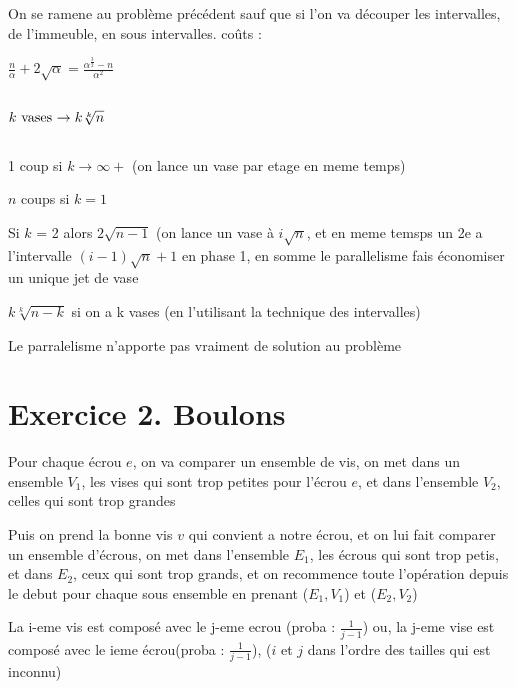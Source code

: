 \documentclass[a4paper]{article}
\begin{document}
On se ramene au problème précédent sauf que si l'on va découper les intervalles, de l'immeuble, en sous intervalles.
coûts : 

\begin{math}
  \frac{n}{\alpha} +2\sqrt{\alpha} = \frac{\alpha^\frac{3}{2}-n}{\alpha^2}
\end{math}

\subsection{}
\begin{math}
k $ vases $ \rightarrow k\sqrt[k]{n}
\end{math}

\subsection{}
\begin{description}
\item 1 coup si $k \rightarrow \infty+$ (on lance un vase par etage en meme temps)
\item $n$ coups si $k = 1$
\item Si $k$ = 2 alors $2\sqrt{n-1}$ (on lance un vase à $i\sqrt{n}$, et en meme temsps un 2e a l'intervalle $(i-1)\sqrt{n}+1$ en phase 1, en somme le parallelisme fais économiser un unique jet de vase
\item $k\sqrt[k]{n-k}$ si on a k vases (en l'utilisant la technique des intervalles)
\end{description}
Le parralelisme n'apporte pas vraiment de solution au problème

\section{Exercice 2. Boulons}
Pour chaque écrou $e$, on va comparer un ensemble de vis, on met dans un ensemble $V_1$, les vises qui sont trop petites pour l'écrou $e$, et dans l'ensemble $V_2$, celles qui sont trop grandes


Puis on prend la bonne vis $v$ qui convient a notre écrou, et on lui fait comparer un ensemble d'écrous, on met dans l'ensemble $E_1$, les écrous qui sont trop petis, et dans $E_2$, ceux qui sont trop grands, et on recommence toute l'opération depuis le debut pour chaque sous ensemble en prenant ($E_1, V_1$) et ($E_2, V_2$)

La i-eme vis est composé avec le j-eme ecrou (proba : $\frac{1}{j-1}$) ou, la j-eme vise est composé avec le ieme écrou(proba : $\frac{1}{j-1}$), ($i$ et $j$ dans l'ordre des tailles qui est inconnu)
\end{document}
